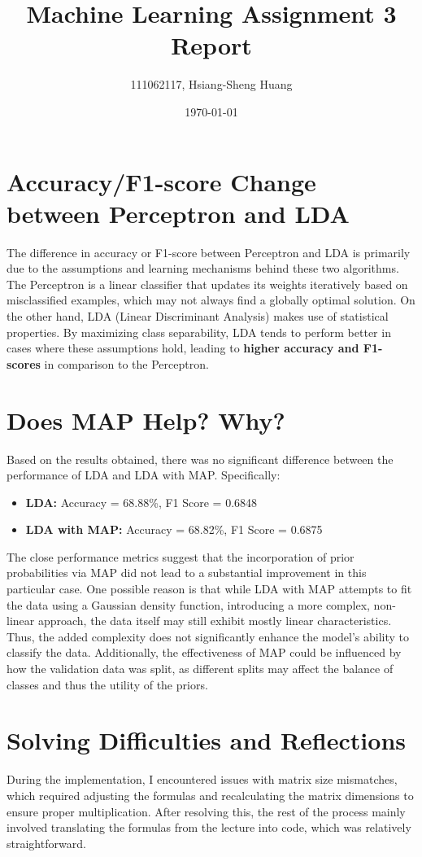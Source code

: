 \documentclass[12pt]{article}
\title{Machine Learning Assignment 3 Report}
\author{111062117, Hsiang-Sheng Huang}
\date{\today}
\begin{document}
\maketitle

\section{Accuracy/F1-score Change between Perceptron and LDA}
The difference in accuracy or F1-score between Perceptron and LDA is primarily due to the assumptions and learning mechanisms behind these two algorithms. The Perceptron is a linear classifier that updates its weights iteratively based on misclassified examples, which may not always find a globally optimal solution. On the other hand, LDA (Linear Discriminant Analysis) makes use of statistical properties. By maximizing class separability, LDA tends to perform better in cases where these assumptions hold, leading to \textbf{higher accuracy and F1-scores} in comparison to the Perceptron.

\section{Does MAP Help? Why?}
Based on the results obtained, there was no significant difference between the performance of LDA and LDA with MAP. Specifically:
\begin{itemize}
    \item \textbf{LDA:} Accuracy = 68.88\%, F1 Score = 0.6848
    \item \textbf{LDA with MAP:} Accuracy = 68.82\%, F1 Score = 0.6875
\end{itemize}
The close performance metrics suggest that the incorporation of prior probabilities via MAP did not lead to a substantial improvement in this particular case. One possible reason is that while LDA with MAP attempts to fit the data using a Gaussian density function, introducing a more complex, non-linear approach, the data itself may still exhibit mostly linear characteristics. Thus, the added complexity does not significantly enhance the model's ability to classify the data. Additionally, the effectiveness of MAP could be influenced by how the validation data was split, as different splits may affect the balance of classes and thus the utility of the priors.

\section{Solving Difficulties and Reflections}
During the implementation, I encountered issues with matrix size mismatches, which required adjusting the formulas and recalculating the matrix dimensions to ensure proper multiplication. After resolving this, the rest of the process mainly involved translating the formulas from the lecture into code, which was relatively straightforward.
\end{document}
